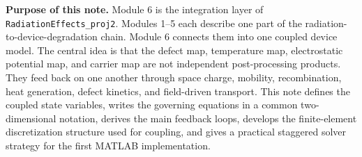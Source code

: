 \documentclass[11pt]{article}
\begin{document}

\begin{overviewbox}
\textbf{Purpose of this note.} Module 6 is the integration layer of \texttt{RadiationEffects\_proj2}. Modules 1--5 each describe one part of the radiation-to-device-degradation chain. Module 6 connects them into one coupled device model. The central idea is that the defect map, temperature map, electrostatic potential map, and carrier map are not independent post-processing products. They feed back on one another through space charge, mobility, recombination, heat generation, defect kinetics, and field-driven transport. This note defines the coupled state variables, writes the governing equations in a common two-dimensional notation, derives the main feedback loops, develops the finite-element discretization structure used for coupling, and gives a practical staggered solver strategy for the first MATLAB implementation.
\end{overviewbox}

\ProjectTOC
\end{document}

